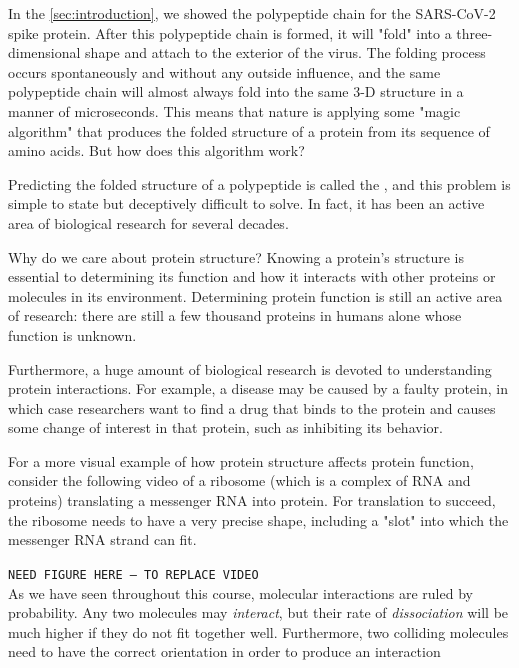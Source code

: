 In the \autoref{sec:introduction}, we showed the polypeptide chain for the SARS-CoV-2 spike protein. After this polypeptide chain is formed, it will "fold" into a three-dimensional shape and attach to the exterior of the virus. The folding process occurs spontaneously and without any outside influence, and the same polypeptide chain will almost always fold into the same 3-D structure in a manner of microseconds. This means that nature is applying some "magic algorithm" that produces the folded structure of a protein from its sequence of amino acids. But how does this algorithm work?

Predicting the folded structure of a polypeptide is called the , and this problem is simple to state but deceptively difficult to solve. In fact, it has been an active area of biological research for several decades.

Why do we care about protein structure? Knowing a protein's structure is essential to determining its function and how it interacts with other proteins or molecules in its environment. Determining protein function is still an active area of research: there are still a few thousand proteins in humans alone whose function is unknown.

Furthermore,  a huge amount of biological research is devoted to understanding protein interactions. For example, a disease may be caused by a faulty protein, in which case researchers want to find a drug that binds to the protein and causes some change of interest in that protein, such as inhibiting its behavior.

For a more visual example of how protein structure affects protein function, consider the following video of a ribosome (which is a complex of RNA and proteins) translating a messenger RNA into protein. For translation to succeed, the ribosome needs to have a very precise shape, including a "slot" into which the messenger RNA strand can fit.

\texttt{NEED FIGURE HERE -- TO REPLACE VIDEO}\\

As we have seen throughout this course, molecular interactions are ruled by probability. Any two molecules may \textit{interact}, but their rate of \textit{dissociation} will be much higher if they do not fit together well. Furthermore, two colliding molecules need to have the correct orientation in order to produce an interaction

